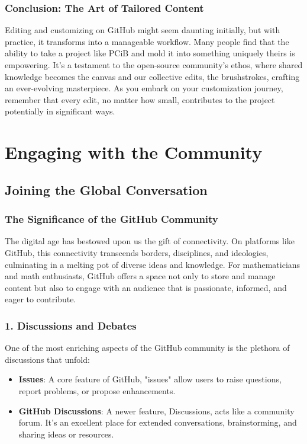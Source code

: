 \documentclass[a4paper,12pt]{book}
\newcounter{problem}
\begin{document}
\subsection*{Conclusion: The Art of Tailored Content}
Editing and customizing on GitHub might seem daunting initially, but with practice, it transforms into a manageable workflow. Many people find that the ability to take a project like PCiB and mold it into something uniquely theirs is empowering. It's a testament to the open-source community's ethos, where shared knowledge becomes the canvas and our collective edits, the brushstrokes, crafting an ever-evolving masterpiece. As you embark on your customization journey, remember that every edit, no matter how small, contributes to the project potentially in significant ways.

\chapter{Engaging with the Community}
\section*{Joining the Global Conversation}

\subsection*{The Significance of the GitHub Community}
The digital age has bestowed upon us the gift of connectivity. On platforms like GitHub, this connectivity transcends borders, disciplines, and ideologies, culminating in a melting pot of diverse ideas and knowledge. For mathematicians and math enthusiasts, GitHub offers a space not only to store and manage content but also to engage with an audience that is passionate, informed, and eager to contribute.

\subsection*{1. Discussions and Debates}
One of the most enriching aspects of the GitHub community is the plethora of discussions that unfold:

\begin{itemize}
    \item \textbf{Issues}: A core feature of GitHub, "issues" allow users to raise questions, report problems, or propose enhancements. 
    \item \textbf{GitHub Discussions}: A newer feature, Discussions, acts like a community forum. It's an excellent place for extended conversations, brainstorming, and sharing ideas or resources.
\end{itemize}
\end{document}

